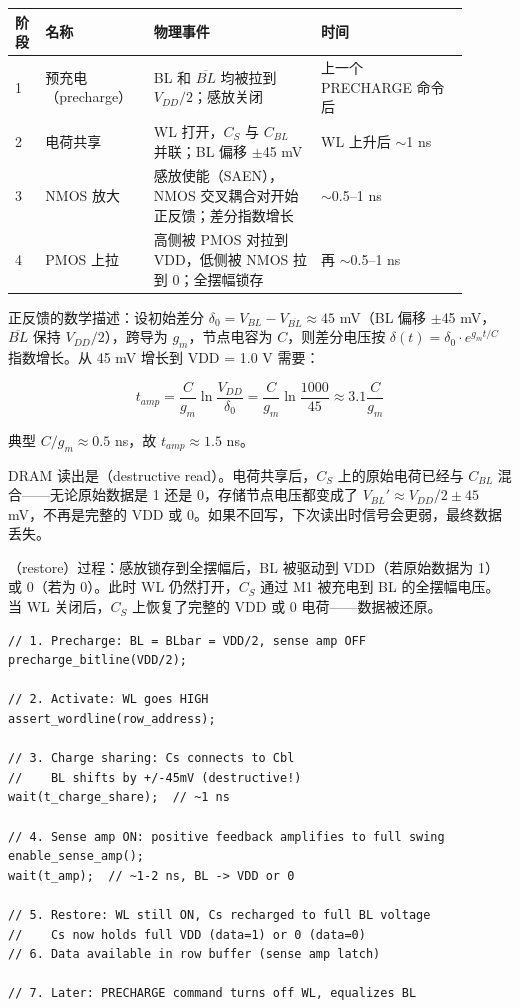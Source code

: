 \begin{longtable}{L{0.06\linewidth}L{0.2\linewidth}L{0.34\linewidth}L{0.3\linewidth}}
\toprule
阶段 & 名称 & 物理事件 & 时间 \\
 & 预充电（precharge） & BL 和 $\overline{BL}$ 均被拉到 $V_{DD}/2$；感放关闭 & 上一个 PRECHARGE 命令后 \\
2 & 电荷共享 & WL 打开，$C_S$ 与 $C_{BL}$ 并联；BL 偏移 $\pm$45 mV & WL 上升后 $\sim$1 ns \\
3 & NMOS 放大 & 感放使能（SAEN），NMOS 交叉耦合对开始正反馈；差分指数增长 & $\sim$0.5--1 ns \\
4 & PMOS 上拉 & 高侧被 PMOS 对拉到 VDD，低侧被 NMOS 拉到 0；全摆幅锁存 & 再 $\sim$0.5--1 ns \\
\bottomrule
\end{longtable}

正反馈的数学描述：设初始差分 $\delta_0 = V_{BL} - V_{\overline{BL}} \approx 45$ mV（BL 偏移 $\pm$45 mV，$\overline{BL}$ 保持 $V_{DD}/2$），跨导为 $g_m$，节点电容为 $C$，则差分电压按 $\delta(t) = \delta_0 \cdot e^{g_m t / C}$ 指数增长。从 45 mV 增长到 VDD = 1.0 V 需要：

$$t_{amp} = \frac{C}{g_m} \ln\frac{V_{DD}}{\delta_0} = \frac{C}{g_m} \ln\frac{1000}{45} \approx 3.1 \frac{C}{g_m}$$

典型 $C/g_m \approx 0.5$ ns，故 $t_{amp} \approx 1.5$ ns。


DRAM 读出是（destructive read）。电荷共享后，$C_S$ 上的原始电荷已经与 $C_{BL}$ 混合——无论原始数据是 1 还是 0，存储节点电压都变成了 $V_{BL}' \approx V_{DD}/2 \pm 45$ mV，不再是完整的 VDD 或 0。如果不回写，下次读出时信号会更弱，最终数据丢失。

（restore）过程：感放锁存到全摆幅后，BL 被驱动到 VDD（若原始数据为 1）或 0（若为 0）。此时 WL 仍然打开，$C_S$ 通过 M1 被充电到 BL 的全摆幅电压。当 WL 关闭后，$C_S$ 上恢复了完整的 VDD 或 0 电荷——数据被还原。

\begin{lstlisting}[numbers=none,caption={DRAM 读出-回写时序（伪代码）}]
// 1. Precharge: BL = BLbar = VDD/2, sense amp OFF
precharge_bitline(VDD/2);

// 2. Activate: WL goes HIGH
assert_wordline(row_address);

// 3. Charge sharing: Cs connects to Cbl
//    BL shifts by +/-45mV (destructive!)
wait(t_charge_share);  // ~1 ns

// 4. Sense amp ON: positive feedback amplifies to full swing
enable_sense_amp();
wait(t_amp);  // ~1-2 ns, BL -> VDD or 0

// 5. Restore: WL still ON, Cs recharged to full BL voltage
//    Cs now holds full VDD (data=1) or 0 (data=0)
// 6. Data available in row buffer (sense amp latch)

// 7. Later: PRECHARGE command turns off WL, equalizes BL
\end{lstlisting}

